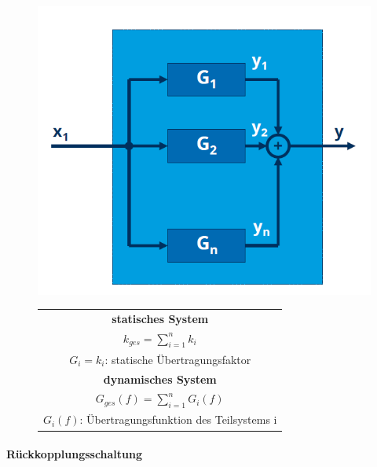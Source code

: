 \documentclass[12pt,a4paper]{article}
\begin{document}
\begin{minipage}{\linewidth}
\centering
\begin{minipage}{0.45\linewidth}
\begin{figure}[H]
\includegraphics[width=
\linewidth]{./resources/parallelschaltung.png}
\end{figure}
\end{minipage}
\hspace{0.05\linewidth}
\begin{minipage}{0.45\linewidth}
\begin{figure}[H]
\begin{tabular}{|c|}
\hline
\textbf{statisches System}\\
$\displaystyle k_{ges} = \sum_{i=1}^n k_i$\\
\hline
$G_i = k_i$: statische Übertragungsfaktor\\
\hline
\textbf{dynamisches System}\\
$\displaystyle G_{ges}(f) = \sum_{i=1}^n G_i(f)$\\
\hline
$G_i(f)$: Übertragungsfunktion des Teilsystems i\\
\hline
\end{tabular}
\end{figure}
\end{minipage}
\end{minipage}

\paragraph{Rückkopplungsschaltung}
\hspace{1pt}
\end{document}

